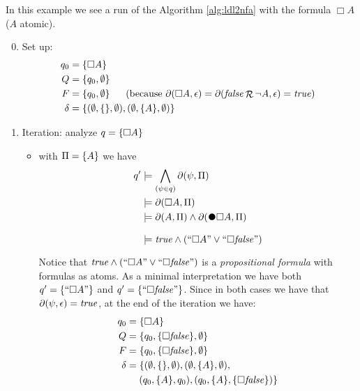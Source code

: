 \begin{example}\label{ldl2nfa-example-always}
	In this example we see a run of the Algorithm \ref{alg:ldl2nfa} with the \LTLf formula $\Box A$ ($A$ atomic).
	\begin{enumerate}
		 \setcounter{enumi}{-1}
		 \item Set up:
		 \begin{align*}
			 q_0 &= \{\Box A\}		\\
			 Q &= \{q_0, \emptyset\}  \\
			 F &= \{q_0, \emptyset\}  \hspace*{.18in} \ \text{(because $\partial\lparen \Box A, \epsilon\rparen = \partial\lparen \mathit{false} \mathop{\mathcal{R}} \lnot A, \epsilon\rparen = \mathit{true}$)}\ \\
			 \delta &= \{(\emptyset, \{\}, \emptyset), (\emptyset, \{A\}, \emptyset)\}
		 \end{align*}
		\item \label{exa:always-A_it-1} Iteration: analyze $q = \{\Box A\}$
		\begin{itemize}
			\item \label{exa:always-A_it-1_prop-A} with $\Pi = \{A\}$ we have 
			\begin{align*}
				q' &\models \bigwedge_{(\psi\in q)} \Dfun{\psi}\\
				   &\models \Dfun{\Box A}\\
				   &\models \Dfun{A} \lAND \Dfun{\Wnext \Box A}\\
				   &\models \true \lAND (``\Box A" \lOR ``\Box \false")
			\end{align*}
			Notice that $\mathit{true} \wedge (``\Box A" \vee ``\Box \mathit{false}")$ is a \emph{propositional formula} with \LTLf formulas as atoms.
			As a minimal interpretation we have both $q' = \{``\Box A"\}$ and $q' = \{``\Box \mathit{false}"\}$.
			Since in both cases we have that $\partial\lparen \psi, \epsilon\rparen=\mathit{true}$, at the end of the iteration we have:
			\begin{align*}
				q_0 &= \{\Box A\}		\\
				Q &= \{q_0, \{\Box \mathit{false}\}, \emptyset\}  \\
				F &= \{q_0, \{\Box \mathit{false}\}, \emptyset\}  \\
				\delta &= \{(\emptyset, \{\}, \emptyset), (\emptyset, \{A\}, \emptyset), \\
				&\hspace*{.18in} (q_0, \{A\}, q_0), (q_0, \{A\}, \{\Box \mathit{false}\})\}
			\end{align*}
			

\end{itemize}
\end{enumerate}
\end{example}
